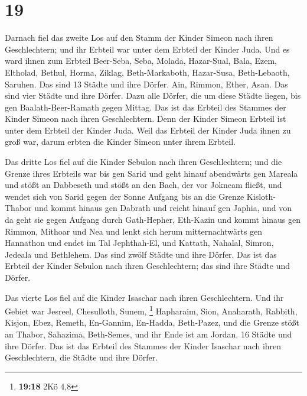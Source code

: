 \hypertarget{section-9}{%
\section{19}\label{section-9}}

 Darnach fiel das zweite Los auf den Stamm der Kinder
Simeon nach ihren Geschlechtern; und ihr Erbteil war unter dem Erbteil
der Kinder Juda.  Und es ward ihnen zum Erbteil Beer-Seba,
Seba, Molada,  Hazar-Sual, Bala, Ezem, 
Eltholad, Bethul, Horma,  Ziklag, Beth-Markaboth,
Hazar-Susa,  Beth-Lebaoth, Saruhen. Das sind 13 Städte und
ihre Dörfer.  Ain, Rimmon, Ether, Asan. Das sind vier
Städte und ihre Dörfer.  Dazu alle Dörfer, die um diese
Städte liegen, bis gen Baalath-Beer-Ramath gegen Mittag. Das ist das
Erbteil des Stammes der Kinder Simeon nach ihren Geschlechtern.
 Denn der Kinder Simeon Erbteil ist unter dem Erbteil der
Kinder Juda. Weil das Erbteil der Kinder Juda ihnen zu groß war, darum
erbten die Kinder Simeon unter ihrem Erbteil.

 Das dritte Los fiel auf die Kinder Sebulon nach ihren
Geschlechtern; und die Grenze ihres Erbteils war bis gen Sarid
 und geht hinauf abendwärts gen Mareala und stößt an
Dabbeseth und stößt an den Bach, der vor Jokneam fließt, 
und wendet sich von Sarid gegen der Sonne Aufgang bis an die Grenze
Kisloth-Thabor und kommt hinaus gen Dabrath und reicht hinauf gen
Japhia,  und von da geht sie gegen Aufgang durch
Gath-Hepher, Eth-Kazin und kommt hinaus gen Rimmon, Mithoar und Nea
 und lenkt sich herum mitternachtwärts gen Hannathon und
endet im Tal Jephthah-El,  und Kattath, Nahalal, Simron,
Jedeala und Bethlehem. Das sind zwölf Städte und ihre Dörfer.
 Das ist das Erbteil der Kinder Sebulon nach ihren
Geschlechtern; das sind ihre Städte und Dörfer.

 Das vierte Los fiel auf die Kinder Isaschar nach ihren
Geschlechtern.  Und ihr Gebiet war Jesreel, Chesulloth,
Sunem, \footnote{\textbf{19:18} 2Kö 4,8}  Hapharaim,
Sion, Anaharath,  Rabbith, Kisjon, Ebez, 
Remeth, En-Gannim, En-Hadda, Beth-Pazez,  und die Grenze
stößt an Thabor, Sahazima, Beth-Semes, und ihr Ende ist am Jordan. 16
Städte und ihre Dörfer.  Das ist das Erbteil des Stammes
der Kinder Isaschar nach ihren Geschlechtern, die Städte und ihre
Dörfer.

